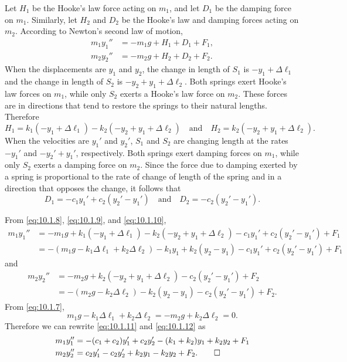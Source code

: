 \begin{solution}
Let $H_1$ be the Hooke's law force acting on $m_1$, and let $D_1$ be
the damping force on $m_1$. Similarly, let $H_2$ and $D_2$ be the
Hooke's law and damping forces acting on $m_2$. According to Newton's
second law of motion,
\begin{equation} \label{eq:10.1.8}
\begin{aligned}
m_1y_1''&=-m_1g+H_1+D_1+F_1,\\
m_2y_2''&=-m_2g+H_2+D_2+F_2.
\end{aligned}
\end{equation}
When the displacements are $y_1$ and $y_2$, the change in length of
$S_1$ is $-y_1+\Delta\ell_1$ and the change in length of $S_2$ is
$-y_2+y_1+\Delta\ell_2$. Both springs exert Hooke's law forces on $m_1$,
while only $S_2$ exerts a Hooke's law force on $m_2$. These forces are
in directions that tend to restore the springs to their natural
lengths. Therefore
\begin{equation} \label{eq:10.1.9}
H_1=k_1(-y_1+\Delta\ell_1)-k_2(-y_2+y_1+\Delta\ell_2)\quad\text{and}\quad
H_2=k_2(-y_2+y_1+\Delta\ell_2).
\end{equation}
When the velocities are $y_1'$ and $y_2'$,  $S_1$ and $S_2$ are
changing length at the rates $-y_1'$ and $-y_2'+y_1'$, respectively.
Both springs exert damping forces on $m_1$, while only $S_2$ exerts a
damping force on $m_2$. Since the force due to damping exerted by a
spring is proportional to the rate of change of length of the spring
and in a direction that opposes the change, it follows that
\begin{equation} \label{eq:10.1.10}
D_1=-c_1y_1'+c_2(y_2'-y_1')\quad\text{and}\quad D_2=-c_2(y_2'-y_1').
\end{equation}

From \eqref{eq:10.1.8}, \eqref{eq:10.1.9}, and \eqref{eq:10.1.10},
\begin{equation} \label{eq:10.1.11}
\begin{aligned}
m_1y_1''&=-m_1g+k_1(-y_1+\Delta\ell_1)-k_2(-y_2+y_1+\Delta\ell_2)
-c_1y_1'+c_2(y_2'-y_1')+F_1\\
&=-(m_1g-k_1\Delta\ell_1+k_2\Delta\ell_2)-k_1y_1+k_2(y_2-y_1)
-c_1y_1'+c_2(y_2'-y_1')+F_1
\end{aligned}
\end{equation}
and
\begin{equation} \label{eq:10.1.12}
\begin{aligned}
m_2y_2''
&=-m_2g+k_2(-y_2+y_1+\Delta\ell_2)-c_2(y_2'-y_1')+F_2\\
&=-(m_2g-k_2\Delta\ell_2)-k_2(y_2-y_1)-c_2(y_2'-y_1')+F_2.
\end{aligned}
\end{equation}
From \eqref{eq:10.1.7},
\[
m_1g-k_1\Delta\ell_1+k_2\Delta\ell_2=-m_2g+k_2\Delta\ell_2=0.
\]
Therefore we can rewrite \eqref{eq:10.1.11} and \eqref{eq:10.1.12}
as
\begin{align*}
m_1y_1''&=-(c_1+c_2)y_1'+c_2y_2'-(k_1+k_2)y_1+k_2y_2+F_1\\
m_2y_2''&=c_2y_1'-c_2y_2'+k_2y_1-k_2y_2+F_2.  \qedhere
\end{align*}
\end{solution}

